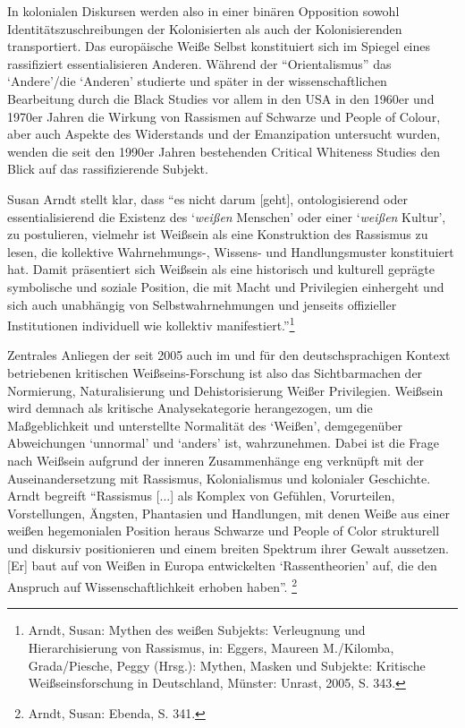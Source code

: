 \documentclass[a4paper,
fontsize=11pt,
oneside,
numbers=noperiodatend,
parskip=half-,
bibliography=totoc,
final
]{scrartcl}
\begin{document}
In kolonialen Diskursen werden also in einer binären Opposition sowohl
Identitätszuschreibungen der Kolonisierten als auch der Kolonisierenden
transportiert. Das europäische Weiße Selbst konstituiert sich im Spiegel
eines rassifiziert essentialisieren Anderen. Während der
\enquote{Orientalismus} das \enquote*{Andere}/die \enquote*{Anderen}
studierte und später in der wissenschaftlichen Bearbeitung durch die
Black Studies vor allem in den USA in den 1960er und 1970er Jahren die
Wirkung von Rassismen auf Schwarze und People of Colour, aber auch
Aspekte des Widerstands und der Emanzipation untersucht wurden, wenden
die seit den 1990er Jahren bestehenden Critical Whiteness Studies den
Blick auf das rassifizierende Subjekt.

Susan Arndt stellt klar, dass \enquote{es nicht darum {[}geht{]},
ontologisierend oder essentialisierend die Existenz des
\enquote*{\emph{weißen} Menschen} oder einer \enquote*{\emph{weißen}
Kultur}, zu postulieren, vielmehr ist Weißsein als eine Konstruktion des
Rassismus zu lesen, die kollektive Wahrnehmungs-, Wissens- und
Handlungsmuster konstituiert hat. Damit präsentiert sich Weißsein als
eine historisch und kulturell geprägte symbolische und soziale Position,
die mit Macht und Privilegien einhergeht und sich auch unabhängig von
Selbstwahrnehmungen und jenseits offizieller Institutionen individuell
wie kollektiv manifestiert.}\footnote{Arndt, Susan: Mythen des weißen
  Subjekts: Verleugnung und Hierarchisierung von Rassismus, in: Eggers,
  Maureen M./Kilomba, Grada/Piesche, Peggy (Hrsg.): Mythen, Masken und
  Subjekte: Kritische Weißseinsforschung in Deutschland, Münster:
  Unrast, 2005, S. 343.}

Zentrales Anliegen der seit 2005 auch im und für den deutschsprachigen
Kontext betriebenen kritischen Weißseins-Forschung ist also das
Sichtbarmachen der Normierung, Naturalisierung und Dehistorisierung
Weißer Privilegien. Weißsein wird demnach als kritische Analysekategorie
herangezogen, um die Maßgeblichkeit und unterstellte Normalität des
\enquote*{Weißen}, demgegenüber Abweichungen \enquote*{unnormal} und
\enquote*{anders} ist, wahrzunehmen. Dabei ist die Frage nach Weißsein
aufgrund der inneren Zusammenhänge eng verknüpft mit der
Auseinandersetzung mit Rassismus, Kolonialismus und kolonialer
Geschichte. Arndt begreift \enquote{Rassismus {[}...{]} als Komplex von
Gefühlen, Vorurteilen, Vorstellungen, Ängsten, Phantasien und
Handlungen, mit denen Weiße aus einer weißen hegemonialen Position
heraus Schwarze und People of Color strukturell und diskursiv
positionieren und einem breiten Spektrum ihrer Gewalt aussetzen.
{[}Er{]} baut auf von Weißen in Europa entwickelten
\enquote*{Rassentheorien} auf, die den Anspruch auf Wissenschaftlichkeit
erhoben haben}. \footnote{Arndt, Susan: Ebenda, S. 341.}
\end{document}
